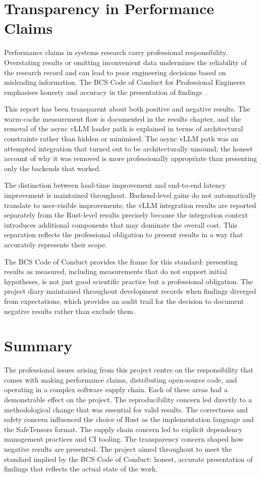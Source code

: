 \section{Transparency in Performance Claims}

Performance claims in systems research carry professional responsibility. Overstating results or omitting inconvenient data undermines the reliability of the research record and can lead to poor engineering decisions based on misleading information. The BCS Code of Conduct for Professional Engineers emphasises honesty and accuracy in the presentation of findings~\cite{bcs_code}.

This report has been transparent about both positive and negative results. The warm-cache measurement flaw is documented in the results chapter, and the removal of the async vLLM loader path is explained in terms of architectural constraints rather than hidden or minimised. The async vLLM path was an attempted integration that turned out to be architecturally unsound; the honest account of why it was removed is more professionally appropriate than presenting only the backends that worked.

The distinction between load-time improvement and end-to-end latency improvement is maintained throughout. Backend-level gains do not automatically translate to user-visible improvements; the vLLM integration results are reported separately from the Rust-level results precisely because the integration context introduces additional components that may dominate the overall cost. This separation reflects the professional obligation to present results in a way that accurately represents their scope.

The BCS Code of Conduct provides the frame for this standard: presenting results as measured, including measurements that do not support initial hypotheses, is not just good scientific practice but a professional obligation. The project diary maintained throughout development records when findings diverged from expectations, which provides an audit trail for the decision to document negative results rather than exclude them.

\section{Summary}

The professional issues arising from this project centre on the responsibility that comes with making performance claims, distributing open-source code, and operating in a complex software supply chain. Each of these areas had a demonstrable effect on the project. The reproducibility concern led directly to a methodological change that was essential for valid results. The correctness and safety concern influenced the choice of Rust as the implementation language and the SafeTensors format. The supply chain concern led to explicit dependency management practices and CI tooling. The transparency concern shaped how negative results are presented. The project aimed throughout to meet the standard implied by the BCS Code of Conduct: honest, accurate presentation of findings that reflects the actual state of the work.
